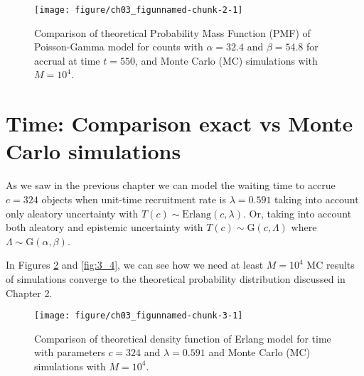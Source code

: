 \begin{figure}
\begin{knitrout}
\color{fgcolor}
\texttt{[image: figure/ch03\_figunnamed-chunk-2-1]} 
\end{knitrout}
\caption{Comparison of theoretical Probability Mass Function (PMF) of Poisson-Gamma model for counts with $\alpha = 32.4$ and $\beta = 54.8$ for accrual at time $t=550$, and Monte Carlo (MC) simulations with $M=10^4$.}
\label{fig:3_2}
\end{figure}



\section{Time: Comparison exact vs Monte Carlo simulations}


As we saw in the previous chapter we can model the waiting time to accrue $c = 324$ objects when unit-time recruitment rate is $\lambda = 0.591$ taking into account only aleatory uncertainty with $T(c)\sim \textrm{Erlang}(c,\lambda)$. Or, taking into account both aleatory and epistemic uncertainty with $T(c)\sim\textrm{G}(c, \Lambda)$ where $\Lambda\sim \textrm{G}(\alpha,\beta)$.


In Figures \ref{fig:3_3} and \ref{fig:3_4}, we can see how we need at least $M=10^4$ MC results of simulations converge to the theoretical probability distribution discussed in Chapter 2.

% 
% 

\begin{figure}
\begin{knitrout}
\color{fgcolor}
\texttt{[image: figure/ch03\_figunnamed-chunk-3-1]} 
\end{knitrout}
\caption{Comparison of theoretical density function of Erlang model for time with parameters $c = 324$ and $\lambda = 0.591$ and Monte Carlo (MC) simulations with $M=10^4$.}
\label{fig:3_3}
\end{figure}



